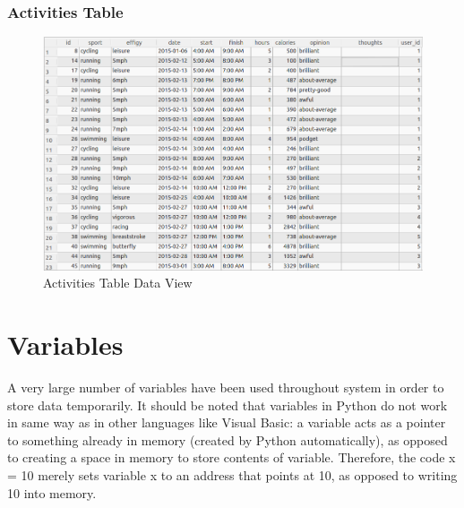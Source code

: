 \documentclass{article}[12pt,a4paper]
\begin{document}
\subsubsection{Activities Table}
\begin{figure}[h!]
  \includegraphics[scale=0.3]{images/database/activities_visual}
  \caption{Activities Table Data View}
\end{figure}

\clearpage

\section{Variables}
A very large number of variables have been used throughout system in order to store data temporarily. It should be noted that variables in Python do not work in same way as in other languages like Visual Basic: a variable acts as a pointer to something already in memory (created by Python automatically), as opposed to creating a space in memory to store contents of variable. Therefore, the code x = 10 merely sets variable x to an address that points at 10, as opposed to writing 10 into memory.
\end{document}
